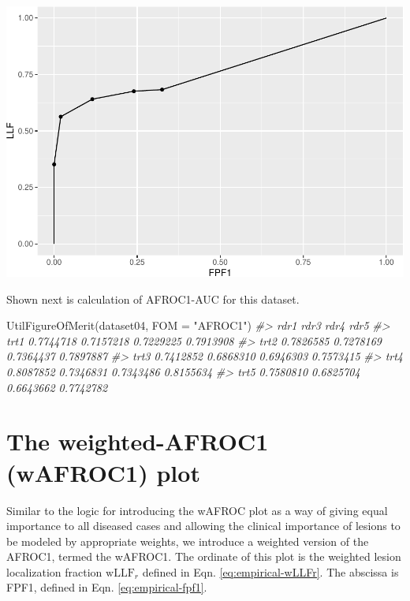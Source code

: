 \documentclass[
]{book}
\newenvironment{Shaded}{\begin{snugshade}}{\end{snugshade}}
\newcommand{\AttributeTok}[1]{\textcolor[rgb]{0.77,0.63,0.00}{#1}}
\newcommand{\CommentTok}[1]{\textcolor[rgb]{0.56,0.35,0.01}{\textit{#1}}}
\newcommand{\FunctionTok}[1]{\textcolor[rgb]{0.00,0.00,0.00}{#1}}
\newcommand{\NormalTok}[1]{#1}
\newcommand{\StringTok}[1]{\textcolor[rgb]{0.31,0.60,0.02}{#1}}
\begin{document}
\includegraphics{03-empirical_files/figure-latex/unnamed-chunk-31-1.pdf}

Shown next is calculation of AFROC1-AUC for this dataset.

\begin{Shaded}
\begin{Highlighting}[]
\FunctionTok{UtilFigureOfMerit}\NormalTok{(dataset04, }\AttributeTok{FOM =} \StringTok{"AFROC1"}\NormalTok{)}
\CommentTok{\#\textgreater{}           rdr1      rdr3      rdr4      rdr5}
\CommentTok{\#\textgreater{} trt1 0.7744718 0.7157218 0.7229225 0.7913908}
\CommentTok{\#\textgreater{} trt2 0.7826585 0.7278169 0.7364437 0.7897887}
\CommentTok{\#\textgreater{} trt3 0.7412852 0.6868310 0.6946303 0.7573415}
\CommentTok{\#\textgreater{} trt4 0.8087852 0.7346831 0.7343486 0.8155634}
\CommentTok{\#\textgreater{} trt5 0.7580810 0.6825704 0.6643662 0.7742782}
\end{Highlighting}
\end{Shaded}

\hypertarget{empirical-wAFROC1}{%
\section{The weighted-AFROC1 (wAFROC1) plot}\label{empirical-wAFROC1}}

Similar to the logic for introducing the wAFROC plot as a way of giving equal importance to all diseased cases and allowing the clinical importance of lesions to be modeled by appropriate weights, we introduce a weighted version of the AFROC1, termed the wAFROC1. The ordinate of this plot is the weighted lesion localization fraction \(\text{wLLF}_r\) defined in Eqn. \eqref{eq:empirical-wLLFr}. The abscissa is FPF1, defined in Eqn. \eqref{eq:empirical-fpf1}.
\end{document}
